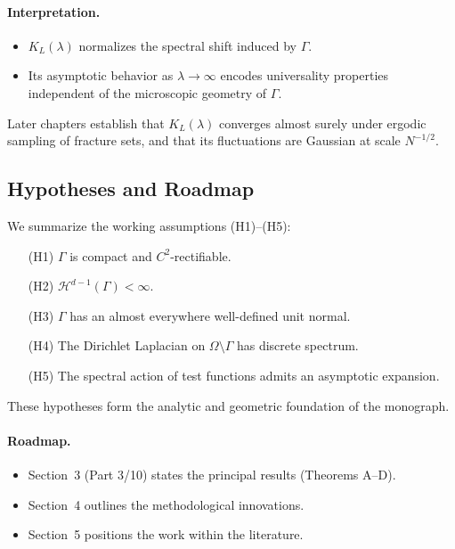 \paragraph{Interpretation.}
\begin{itemize}
  \item $K_L(\lambda)$ normalizes the spectral shift induced by $\Gamma$.
  \item Its asymptotic behavior as $\lambda\to\infty$ encodes universality
  properties independent of the microscopic geometry of $\Gamma$.
\end{itemize}

Later chapters establish that $K_L(\lambda)$ converges almost surely under
ergodic sampling of fracture sets, and that its fluctuations are Gaussian at
scale $N^{-1/2}$.

\subsection{Hypotheses and Roadmap}

We summarize the working assumptions (H1)--(H5):

\begin{enumerate}
  \item[(H1)] $\Gamma$ is compact and $C^2$-rectifiable.
  \item[(H2)] $\mathcal{H}^{d-1}(\Gamma)<\infty$.
  \item[(H3)] $\Gamma$ has an almost everywhere well-defined unit normal.
  \item[(H4)] The Dirichlet Laplacian on $\Omega\setminus\Gamma$ has discrete
  spectrum.
  \item[(H5)] The spectral action of test functions admits an asymptotic
  expansion.
\end{enumerate}

These hypotheses form the analytic and geometric foundation of the monograph.

\paragraph{Roadmap.}
\begin{itemize}
  \item Section~3 (Part 3/10) states the principal results (Theorems A--D).
  \item Section~4 outlines the methodological innovations.
  \item Section~5 positions the work within the literature.
\end{itemize}

